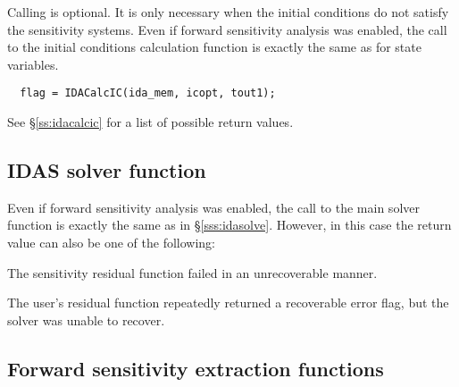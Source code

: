 Calling  is optional. It is only necessary when the  
initial conditions do not satisfy the sensitivity systems. Even if forward 
sensitivity analysis was enabled, the call to the initial conditions
calculation function  is exactly the same as for state 
variables.

\begin{verbatim}
  flag = IDACalcIC(ida_mem, icopt, tout1);
\end{verbatim}

See \S\ref{ss:idacalcic} for a list of possible return values.


\subsection{IDAS solver function}
Even if forward sensitivity analysis was enabled, the call to the main solver 
function  is exactly the same as in \S\ref{sss:idasolve}. However, 
in this case the return value  can also be one of the following:
\begin{args}
\item[\Id{IDA\_SRES\_FAIL}]
  The sensitivity residual function failed in an unrecoverable manner.
\item[\Id{IDA\_REP\_SRES\_ERR}]
  The user's residual function repeatedly returned a recoverable error flag, 
  but the solver was unable to recover.
\end{args}


\subsection{Forward sensitivity extraction functions}\label{ss:sensi_get}

